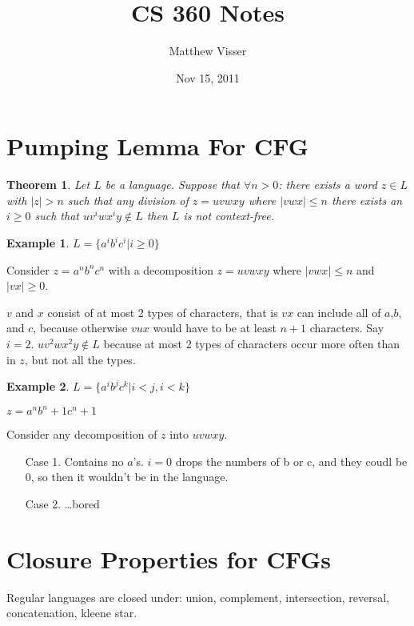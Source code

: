 \documentclass[12pt]{article}
\newtheorem{thm}{Theorem}
\theoremstyle{definition}
\newtheorem{exmpl}{Example}
\begin{document}
\title{CS 360 Notes}
\author{Matthew Visser}
\date{Nov 15, 2011}
\maketitle

\section{Pumping Lemma For CFG}

\begin{thm}
Let $L$ be a language. Suppose that $\forall n > 0$: there exists a word
$z \in L$ with $|z|>n$ such that any division of $z = uvwxy$ where $|vwx|\le n$
there exists an $i \ge 0$ such that $uv^iwx^iy \notin L$ then $L$ is not
context-free.
\end{thm}

\begin{exmpl}

$L = \{a^ib^ic^i|i \ge0\}$

Consider $z = a^nb^nc^n$ with a decomposition $z=uvwxy$ where $|vwx|\le n$ and
$|vx| \ge 0$.

$v$ and $x$ consist of at most 2 types of characters, that is $vx$ can include
all of $a$,$b$, and $c$, because otherwise $vux$ would have to be at least $n+1$
characters. Say $i=2$. $uv^2wx^2y \notin L$ because at most 2 types of
characters occur more often than in $z$, but not all the types.
\end{exmpl}

\begin{exmpl}
	$L = \{ a^ib^jc^k|i<j, i<k\}$

	$z = a^nb^n+1c^n+1$

	Consider any decomposition of $z$ into $uvwxy$.

	\begin{enumerate}
		\item[Case 1.] Contains no $a$'s. $i=0$ drops the numbers of b or c, and
			they coudl be 0, so then it wouldn't be in the language.
		\item[Case 2.]  \dots bored
	\end{enumerate}
\end{exmpl}

\section{Closure Properties for CFGs}

Regular languages are closed under: union, complement, intersection, reversal,
concatenation, kleene star.
\end{document}
